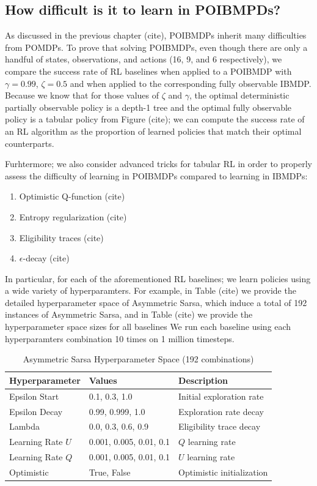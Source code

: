 \subsection{How difficult is it to learn in POIBMPDs?}

As discussed in the previous chapter (cite), POIBMDPs inherit many difficulties from POMDPs.
To prove that solving POIBMDPs, even though there are only a handful of states, observations, and actions (16, 9, and 6 respectively), we compare the success rate of RL baselines when applied to a POIBMDP with $\gamma=0.99$, $\zeta=0.5$ and when applied to the corresponding fully observable IBMDP.
Because we know that for those values of $\zeta$ and $\gamma$, the optimal deterministic partially observable policy is a depth-1 tree and the optimal fully observable policy is a tabular policy from Figure (cite); we can compute the success rate of an RL algorithm as the proportion of learned policies that match their optimal counterparts.

Furhtermore; we also consider advanced tricks for tabular RL in order to properly assess the difficulty of learning in POIBMDPs compared to learning in IBMDPs:
\begin{enumerate}
    \item Optimistic Q-function (cite)
    \item Entropy regularization (cite)
    \item Eligibility traces (cite)
    \item $\epsilon$-decay (cite)
\end{enumerate}
In particular, for each of the aforementioned RL baselines; we learn policies using a wide variety of hyperparamters.
For example, in Table (cite) we provide the detailed hyperparameter space of Asymmetric Sarsa, which induce a total of 192 instances of Asymmetric Sarsa, and in Table (cite) we provide the hyperparameter space sizes for all baselines 
We run each baseline using each hyperparamters combination 10 times on 1 million timesteps.

\begin{table}[h]
\centering
\caption{Asymmetric Sarsa Hyperparameter Space (192 combinations)}
\begin{tabular}{lll}
\toprule
\textbf{Hyperparameter} & \textbf{Values} & \textbf{Description} \\
\midrule
Epsilon Start & 0.1, 0.3, 1.0 & Initial exploration rate \\
Epsilon Decay & 0.99, 0.999, 1.0 & Exploration rate decay \\
Lambda & 0.0, 0.3, 0.6, 0.9 & Eligibility trace decay \\
Learning Rate $U$ & 0.001, 0.005, 0.01, 0.1 & $Q$ learning rate \\
Learning Rate $Q$ & 0.001, 0.005, 0.01, 0.1 & $U$ learning rate \\
Optimistic & True, False & Optimistic initialization \\
\bottomrule
\end{tabular}
\end{table}

